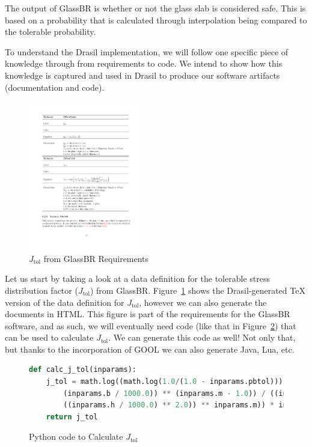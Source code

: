 \documentclass[sigconf]{acmart}
\newcommand{\jtol}{$J_{\mbox{tol}}$}
\begin{document}
The output of GlassBR is whether or not the glass slab is considered safe. This 
is based on a probability that is calculated through interpolation being 
compared to the tolerable probability.

To understand the Drasil implementation, we will follow one specific piece of 
knowledge through from requirements to code. We intend to show how this 
knowledge is captured and used in Drasil to produce our software artifacts 
(documentation and code).



\begin{figure}
\begin{center}
\includegraphics[width=0.45\textwidth]{./figures/Jtol_pdf.pdf}
\end{center}
\caption{\jtol{} from GlassBR Requirements}
\label{Fig_Jtolpdf}
\end{figure}

Let us start by taking a look at a data definition for the tolerable stress 
distribution factor (\jtol{}) from GlassBR. Figure~\ref{Fig_Jtolpdf} 
shows the Drasil-generated TeX version of the data definition for 
\jtol{}, however we can also generate the documents in HTML. This 
figure is part of the requirements for the GlassBR software, and as such, we 
will eventually need code (like that in Figure~\ref{Fig_JtolPython}) that can be
used to calculate \jtol{}. We can generate this code as well! Not only 
that, but thanks to the incorporation of GOOL we can also generate Java, Lua, 
etc. 

\begin{figure}
\begin{lstlisting}[language=python, frame=single, showstringspaces=false, 
basicstyle=\small]
def calc_j_tol(inparams):
    j_tol = math.log((math.log(1.0/(1.0 - inparams.pbtol))) * ((((inparams.a / 1000.0) * 
        (inparams.b / 1000.0)) ** (inparams.m - 1.0)) / ((inparams.k * (((inparams.E * 1000.0) * 
        ((inparams.h / 1000.0) ** 2.0)) ** inparams.m)) * inparams.ldf))) 
    return j_tol
\end{lstlisting}
\caption{Python code to Calculate \jtol{}}
\label{Fig_JtolPython}
\end{figure}
\end{document}
